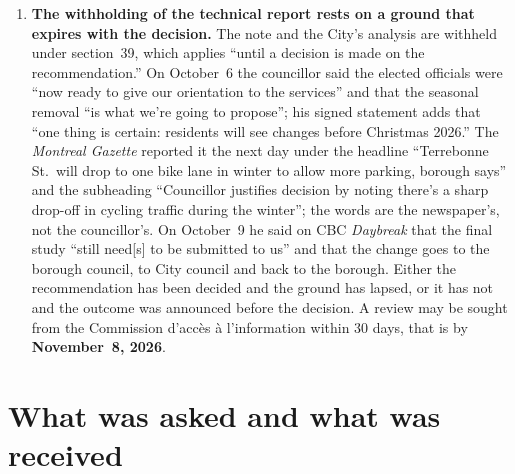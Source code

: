 \documentclass[11pt,letterpaper]{article}
\begin{document}
\begin{enumerate}[nosep]
\begin{minipage}[t]{\linewidth}
    les donn\'ees, analyser et corriger au besoin'': technical analysis, data
    collection and field observation through the peak season, led by the
    Service de l'urbanisme et de la mobilit\'e, with results expected at the
    end of 2026; the same release names Terrebonne among streets where the
    City is working with the borough on safety. On Terrebonne the objective
    was fixed before any analysis, the SUM's analysis was unfavourable and
    withheld, the mandate was to increase parking, no data were collected,
    and the change was announced while the City's audit was still under
    way.\end{minipage}\vspace{0.35em}
\item \begin{minipage}[t]{\linewidth}\textbf{The withholding of the technical report rests on a ground
    that expires with the decision.} The note and the City's analysis are withheld under
    section~39, which applies ``until a decision is made on the
    recommendation.'' On October~6 the councillor said the elected officials
    were ``now ready to give our orientation to the services'' and that the
    seasonal removal ``is what we're going to propose''; his signed
    statement adds that ``one thing is certain: residents will see changes
    before Christmas 2026.'' The \emph{Montreal Gazette} reported it the
    next day under the headline ``Terrebonne St.~will drop to one bike lane
    in winter to allow more parking, borough says'' and the subheading
    ``Councillor justifies decision by noting there's a sharp drop-off in
    cycling traffic during the winter''; the words are the newspaper's, not
    the councillor's. On October~9 he said on CBC \emph{Daybreak} that the
    final study ``still need[s] to be submitted to us'' and that the change
    goes to the borough council, to City council and back to the borough.
    Either the recommendation has been decided and
    the ground has lapsed, or it has not and the outcome was announced
    before the decision. A
    review may be sought from the Commission d'acc\`es \`a l'information
    within 30 days, that is by \textbf{November~8, 2026}.\end{minipage}\vspace{0.35em}
\end{enumerate}

\section{What was asked and what was received}
\end{document}
